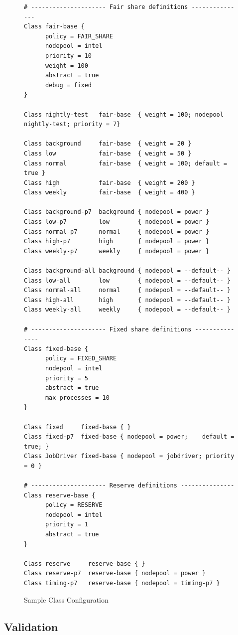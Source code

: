    \begin{figure}[H]    
\begin{verbatim}
# --------------------- Fair share definitions ---------------
Class fair-base {
      policy = FAIR_SHARE
      nodepool = intel
      priority = 10
      weight = 100
      abstract = true
      debug = fixed
}

Class nightly-test   fair-base  { weight = 100; nodepool nightly-test; priority = 7}

Class background     fair-base  { weight = 20 }
Class low            fair-base  { weight = 50 }
Class normal         fair-base  { weight = 100; default = true }
Class high           fair-base  { weight = 200 }
Class weekly         fair-base  { weight = 400 }

Class background-p7  background { nodepool = power }
Class low-p7         low        { nodepool = power }
Class normal-p7      normal     { nodepool = power }
Class high-p7        high       { nodepool = power }
Class weekly-p7      weekly     { nodepool = power }

Class background-all background { nodepool = --default-- }
Class low-all        low        { nodepool = --default-- }
Class normal-all     normal     { nodepool = --default-- }
Class high-all       high       { nodepool = --default-- }
Class weekly-all     weekly     { nodepool = --default-- }

# --------------------- Fixed share definitions ---------------
Class fixed-base {
      policy = FIXED_SHARE
      nodepool = intel
      priority = 5
      abstract = true
      max-processes = 10
}

Class fixed     fixed-base { }
Class fixed-p7  fixed-base { nodepool = power;    default = true; }
Class JobDriver fixed-base { nodepool = jobdriver; priority = 0 }      

# --------------------- Reserve definitions ---------------
Class reserve-base {
      policy = RESERVE
      nodepool = intel
      priority = 1
      abstract = true
}
 
Class reserve     reserve-base { }
Class reserve-p7  reserve-base { nodepool = power }
Class timing-p7   reserve-base { nodepool = timing-p7 }
\end{verbatim}
          \caption{Sample Class Configuration}
      \label{fig:class.configuration}
    \end{figure}
    
\subsection{Validation}

